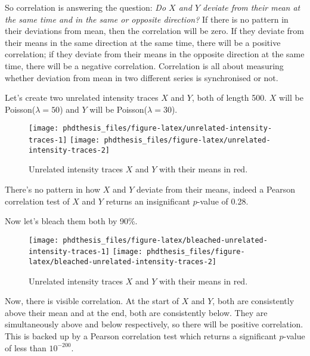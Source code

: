 \documentclass[12pt,]{book}
\theoremstyle{definition}
\theoremstyle{definition}
\theoremstyle{definition}
\theoremstyle{remark}
\begin{document}
So correlation is answering the question: \emph{Do \(X\) and \(Y\)
deviate from their mean at the same time and in the same or opposite
direction?} If there is no pattern in their deviations from mean, then
the correlation will be zero. If they deviate from their means in the
same direction at the same time, there will be a positive correlation;
if they deviate from their means in the opposite direction at the same
time, there will be a negative correlation. Correlation is all about
measuring whether deviation from mean in two different series is
synchronised or not.

Let's create two unrelated intensity traces \(X\) and \(Y\), both of
length 500. \(X\) will be Poisson(\(\lambda = 50\)) and \(Y\) will be
Poisson(\(\lambda = 30\)).




\begin{figure}

\texttt{[image: phdthesis\_files/figure-latex/unrelated-intensity-traces-1]} \texttt{[image: phdthesis\_files/figure-latex/unrelated-intensity-traces-2]} \hfill{}

\caption{Unrelated intensity traces
\(X\) and \(Y\) with their means in red.}\label{fig:unrelated-intensity-traces}
\end{figure}

There's no pattern in how \(X\) and \(Y\) deviate from their means,
indeed a Pearson correlation test of \(X\) and \(Y\) returns an
insignificant \(p\)-value of 0.28.

Now let's bleach them both by 90\%.

\begin{figure}

\texttt{[image: phdthesis\_files/figure-latex/bleached-unrelated-intensity-traces-1]} \texttt{[image: phdthesis\_files/figure-latex/bleached-unrelated-intensity-traces-2]} \hfill{}

\caption{Unrelated intensity traces
\(X\) and \(Y\) with their means in red.}\label{fig:bleached-unrelated-intensity-traces}
\end{figure}

Now, there is visible correlation. At the start of \(X\) and \(Y\), both
are consistently above their mean and at the end, both are consistently
below. They are simultaneously above and below respectively, so there
will be positive correlation. This is backed up by a Pearson correlation
test which returns a significant \(p\)-value of less than \(10^{-200}\).
\end{document}
